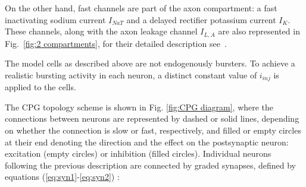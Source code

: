 
On the other hand, fast channels are part of the axon compartment: a fast inactivating sodium current $I_{NaT}$ and a delayed rectifier potassium current $I_{K}$. These channels, along with the axon leakage channel  $I_{L,A}$ are also represented in Fig.~\ref{fig:2 compartments}, for their detailed description see~\cite{Vavoulis2007}. 



The model cells as described above are not endogenously bursters. To achieve a realistic bursting activity in each neuron, a distinct constant value of  \(i_{inj}\) is applied to the cells. %

 The CPG topology scheme is shown in Fig. \ref{fig:CPG diagram}, where the connections between neurons are represented by dashed or solid lines, depending on whether the connection is slow or fast, respectively, and filled or empty circles at their end denoting the direction and the effect on the postsynaptic neuron: excitation (empty circles) or inhibition (filled circles).
Individual neurons following the previous description are connected by graded synapses, defined by equations (\ref{eq:syn1}-\ref{eq:syn2}) \cite{Vavoulis2007}:





